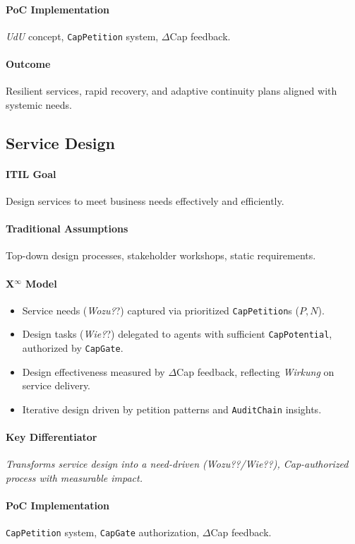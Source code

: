 \documentclass[12pt, a4paper]{scrartcl}
\newcommand{\Xinf}{X$^\infty$}                        %
\newcommand{\DeltaCap}{$\Delta$Cap}                    %
\newcommand{\CapPotential}{\texttt{CapPotential}}    %
\newcommand{\Wirkung}{\textit{Wirkung}}                 %
\newcommand{\CapGate}{\texttt{CapGate}}
\newcommand{\AuditChain}{\texttt{AuditChain}}
\newcommand{\CapPetition}{\texttt{CapPetition}}        %
\newcommand{\UdU}{\textit{UdU}} %
\newcommand{\Wozu}{\textit{Wozu?}}                      %
\newcommand{\Wie}{\textit{Wie?}}                        %
\begin{document}
\paragraph{PoC Implementation} \UdU{} concept, \CapPetition{} system, \DeltaCap{} feedback.
\paragraph{Outcome} Resilient services, rapid recovery, and adaptive continuity plans aligned with systemic needs.

\subsection{Service Design} %
\paragraph{ITIL Goal} Design services to meet business needs effectively and efficiently.
\paragraph{Traditional Assumptions} Top-down design processes, stakeholder workshops, static requirements.
\paragraph*{\Xinf{} Model}
\begin{itemize}
    \item Service needs (\Wozu?) captured via prioritized \CapPetition{}s ($P, N$).
    \item Design tasks (\Wie?) delegated to agents with sufficient \CapPotential{}, authorized by \CapGate{}.
    \item Design effectiveness measured by \DeltaCap{} feedback, reflecting \Wirkung{} on service delivery.
    \item Iterative design driven by petition patterns and \AuditChain{} insights.
\end{itemize}
\paragraph{Key Differentiator} \textit{Transforms service design into a need-driven (\Wozu?/\Wie?), Cap-authorized process with measurable impact.}
\paragraph{PoC Implementation} \CapPetition{} system, \CapGate{} authorization, \DeltaCap{} feedback.
\end{document}
